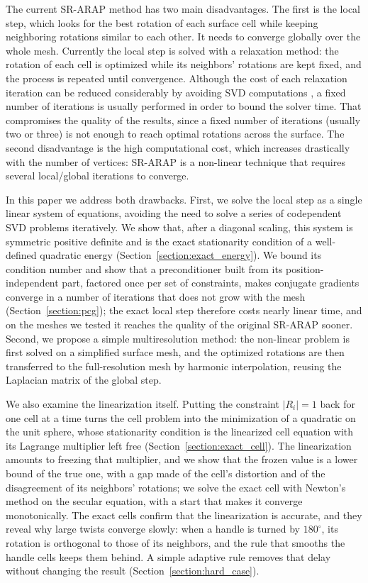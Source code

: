 \documentclass{birkjour}
\theoremstyle{remark}
\numberwithin{equation}{section}
\begin{document}
The current SR-ARAP method has two main disadvantages. The first is the local step, which looks for the best rotation of each surface cell while keeping neighboring rotations similar to each other. It needs to converge globally over the whole mesh. Currently the local step is solved with a relaxation method: the rotation of each cell is optimized while its neighbors' rotations are kept fixed, and the process is repeated until convergence. Although the cost of each relaxation iteration can be reduced considerably by avoiding SVD computations \cite{Ligare2020}, a fixed number of iterations is usually performed in order to bound the solver time. That compromises the quality of the results, since a fixed number of iterations (usually two or three) is not enough to reach optimal rotations across the surface. The second disadvantage is the high computational cost, which increases drastically with the number of vertices: SR-ARAP is a non-linear technique that requires several local/global iterations to converge.

In this paper we address both drawbacks. First, we solve the local step as a single linear system of equations, avoiding the need to solve a series of codependent SVD problems iteratively. We show that, after a diagonal scaling, this system is symmetric positive definite and is the exact stationarity condition of a well-defined quadratic energy (Section~\ref{section:exact_energy}). We bound its condition number and show that a preconditioner built from its position-independent part, factored once per set of constraints, makes conjugate gradients converge in a number of iterations that does not grow with the mesh (Section~\ref{section:pcg}); the exact local step therefore costs nearly linear time, and on the meshes we tested it reaches the quality of the original SR-ARAP sooner. Second, we propose a simple multiresolution method: the non-linear problem is first solved on a simplified surface mesh, and the optimized rotations are then transferred to the full-resolution mesh by harmonic interpolation, reusing the Laplacian matrix of the global step.

We also examine the linearization itself. Putting the constraint $|R_i| = 1$ back for one cell at a time turns the cell problem into the minimization of a quadratic on the unit sphere, whose stationarity condition is the linearized cell equation with its Lagrange multiplier left free (Section~\ref{section:exact_cell}). The linearization amounts to freezing that multiplier, and we show that the frozen value is a lower bound of the true one, with a gap made of the cell's distortion and of the disagreement of its neighbors' rotations; we solve the exact cell with Newton's method on the secular equation, with a start that makes it converge monotonically. The exact cells confirm that the linearization is accurate, and they reveal why large twists converge slowly: when a handle is turned by $180^\circ$, its rotation is orthogonal to those of its neighbors, and the rule that smooths the handle cells keeps them behind. A simple adaptive rule removes that delay without changing the result (Section~\ref{section:hard_case}).
\end{document}
